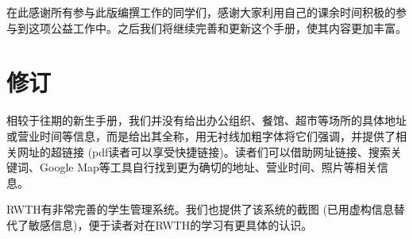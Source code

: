   在此感谢所有参与此版编撰工作的同学们，感谢大家利用自己的课余时间积极的参与到这项公益工作中。之后我们将继续完善和更新这个手册，使其内容更加丰富。



  \newpage

\chapter*{修订}

  相较于往期的新生手册，我们并没有给出办公组织、餐馆、超市等场所的具体地址或营业时间等信息，而是给出其全称，用无衬线加粗字体将它们强调，并提供了相关网址的超链接 (pdf读者可以享受快捷链接)。读者们可以借助网址链接、搜索关键词、Google Map等工具自行找到更为确切的地址、营业时间、照片等相关信息。

  RWTH有非常完善的学生管理系统。我们也提供了该系统的截图 (已用虚构信息替代了敏感信息)，便于读者对在RWTH的学习有更具体的认识。
